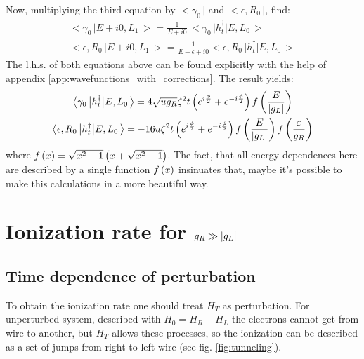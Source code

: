 Now, multiplying the third equation by $ \big<\gamma_{0}\,\big| $ and $ \big<\epsilon,R_{0}\,\big |$, find:
\begin{gather}
	\big<\gamma_{0}\,\big|E+i0,L_{1}\,\big>=\frac{1}{E+i0}\,\big<\gamma_{0}\,\big|h_{t}^{\dagger}\big|E,L_{0}\,\big>\\\big<\epsilon,R_{0}\,\big|E+i0,L_{1}\,\big>=\frac{1}{E-\epsilon+i0}\big<\epsilon,R_{0}\,\big|h_{t}^{\dagger}\big|E,L_{0}\,\big>
\end{gather}
The l.h.s. of both equations above can be found explicitly with the help of appendix \ref{app:wavefunctions_with_corrections}.  The result yields:
\begin{gather}
\label{tunnel_matrix_elements_maj-cont}
	\big<\gamma_{0}\,\big|h_{t}^{\dagger}\big|E,L_{0}\,\big>
	=
	4\sqrt{ug_{R}}
	\zeta^{2}t
	\left(e^{i\frac{\phi}{2}}+e^{-i\frac{\phi}{2}}\right)
	f\left(\frac{E}{\left|g_L\right|}\right)
	\\
	\label{tunnel_matrix_elements_cont-cont}
	\big<\epsilon,R_{0}\,\big|h_{t}^{\dagger}\big|E,L_{0}\,\big>
	=
	-16u\zeta^{2}t
	\left(e^{i\frac{\phi}{2}}+e^{-i\frac{\phi}{2}}\right)
	f\left(\frac{E}{\left|g_L\right|}\right)
	f\left(\frac{\varepsilon}{g_R}\right)
\end{gather}
where $ f\left(x\right)=\sqrt{x^2-1}\left(x+\sqrt{x^2-1}\right) $. The fact, that all energy dependences here are described by a single function $ f\left(x\right) $ insinuates that, maybe it's possible to make this calculations in a more beautiful way.

\section{Ionization rate for $ g_R\gg\left|g_L\right| $}


\subsection{Time dependence of perturbation}

To obtain the ionization rate one should treat $ H_T $ as perturbation. For unperturbed system, described with $ H_0=H_R+H_L $ the electrons cannot get from wire to another, but $ H_T $ allows these processes, so the ionization can be described as a set of jumps from right to left wire (see fig. \ref{fig:tunneling}).

